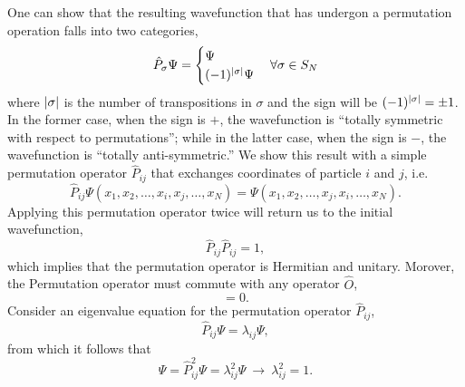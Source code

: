         One can show that the resulting wavefunction that has undergon a permutation operation 
        falls into two categories,
        \begin{equation}
            \hat{P}_\sigma\Psi = 
            \begin{cases}
                \Psi &\\
                (-1)^{\abs{\sigma}}\Psi& 
            \end{cases} \forall \sigma \in S_N
        \end{equation}
        where $\abs{\sigma}$ is the number of transpositions in $\sigma$ and the sign 
        will be $(-1)^{\abs{\sigma}} = \pm 1$. In the former case, when the sign is $+$,
        the wavefunction is ``totally symmetric with respect to permutations''; while in 
        the latter case, when the sign is $-$, the wavefunction is ``totally anti-symmetric.''
        We show this result with a simple permutation operator $\hat{P}_{ij}$ that exchanges 
        coordinates of particle $i$ and $j$, i.e.
        \begin{equation}
            \hat{P}_{ij}\Psi(x_1, x_2, \dots, x_i, x_j, \dots, x_N)
            =  \Psi(x_1, x_2, \dots, x_j, x_i, \dots, x_N).
        \end{equation}
        Applying this permutation operator twice will return us to the initial wavefunction,
        \begin{equation}
            \hat{P}_{ij} \hat{P}_{ij} = 1,
        \end{equation}
        which implies that the permutation operator is Hermitian and unitary. Morover, the 
        Permutation operator must commute with any operator $\hat{O}$,
        \begin{equation}
            [\hat{P}_{ij}, \hat{O}] = 0.
        \end{equation}
        Consider an eigenvalue equation for the permutation operator $\hat{P}_{ij}$,
        \begin{equation}
            \hat{P}_{ij}\Psi = \lambda_{ij}\Psi,
        \end{equation}
        from which it follows that 
        \begin{equation}
            \Psi = \hat{P}_{ij}^2 \Psi = \lambda_{ij}^2\Psi\ \to \  \lambda_{ij}^2 = 1.
        \end{equation}

